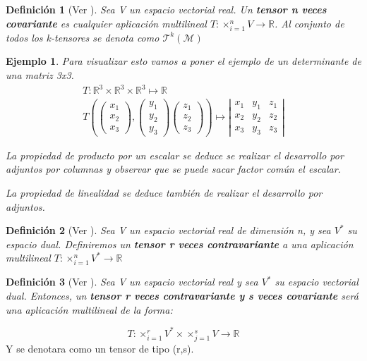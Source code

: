 \documentclass[pdftex,11pt,a4paper]{book}
\newtheorem{defi}{Definici\'on}
\newtheorem{ejem}{Ejemplo}
\newcommand{\R}{$\mathbb{R}$}
\begin{document}
\begin{defi}[Ver \cite{chamizo}]
    Sea V un espacio vectorial real. Un \textbf{tensor n veces covariante} es cualquier aplicación multilineal $T:\times_{i=1}^n V \to $\R. Al conjunto de todos los k-tensores se denota como $\mathcal{T}^k(\mathscr{M})$
\end{defi}

\begin{ejem}
Para visualizar esto vamos a poner el ejemplo de un determinante de una matriz 3x3. 
$$\begin{array}{l}
T: \mathbb{R}^{3} \times \mathbb{R}^{3} \times \mathbb{R}^{3} \longmapsto \mathbb{R} \\
T \left( \left(\begin{array}{l}
x_{1} \\
x_{2} \\
x_{3}
\end{array}\right),\left(\begin{array}{l}
y_{1} \\
y_{2} \\
y_{3}
\end{array}\right)\left(\begin{array}{l}
z_{1} \\
z_{2} \\
z_{3}
\end{array}\right)\right) \longmapsto\left|\begin{array}{lll}
x_{1} & y_{1} & z_{1} \\
x_{2} & y_{2} & z_{2} \\
x_{3} & y_{3} & z_{3}
\end{array}\right| 
\end{array}  $$

La propiedad de producto por un escalar se deduce se realizar el desarrollo por adjuntos por columnas y observar que se puede sacar factor común el escalar. 

La propiedad de linealidad se deduce también de realizar el desarrollo por adjuntos. 
\end{ejem}

\begin{defi}[Ver \cite{chamizo}]
Sea V un espacio vectorial real de dimensión n, y sea $V^*$ su espacio dual. Definiremos un \textbf{tensor r veces contravariante} a una aplicación multilineal $T: \times_{ i = 1}^n V^*\to \mathbb{R}
$
\end{defi}


\begin{defi}[Ver \cite{chamizo}]
Sea V un espacio vectorial real y sea $V^*$ su espacio vectorial dual. Entonces, un \textbf{ tensor r veces contravariante y s veces covariante} será una aplicación multilineal de la forma: \end{defi}
\begin{equation*}
    T:\times_{i=1}^r V^* \times \times_{j=1}^s V \to \mathbb{R}
\end{equation*}
Y se denotara como un tensor de tipo (r,s).
\end{document}
